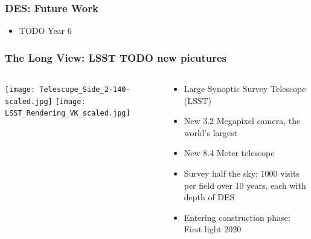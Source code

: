 \documentclass{beamer}
\begin{document}
\frame
{
    \frametitle{DES: Future Work}

 
    \begin{itemize}

        \item TODO Year 6

    \end{itemize}

}


\frame
{
    \frametitle{The Long View: LSST TODO new picutures}

    \begin{columns}

        \begin{column}{0.5\textwidth}    
            \texttt{[image: Telescope\_Side\_2-140-scaled.jpg]}
            \newline
            \texttt{[image: LSST\_Rendering\_VK\_scaled.jpg]}
        \end{column}

        \begin{column}{0.5\textwidth}    

            \begin{itemize}

                \item Large Synoptic Survey Telescope (LSST)

                \item New 3.2 Megapixel camera, the world's largest

                \item New 8.4 Meter telescope

                \item Survey half the sky; 1000 visits per field over 10 years, each
                    with depth of DES 

                \item Entering construction phase; First light 2020

            \end{itemize}
        \end{column}


    \end{columns}
}
\end{document}
